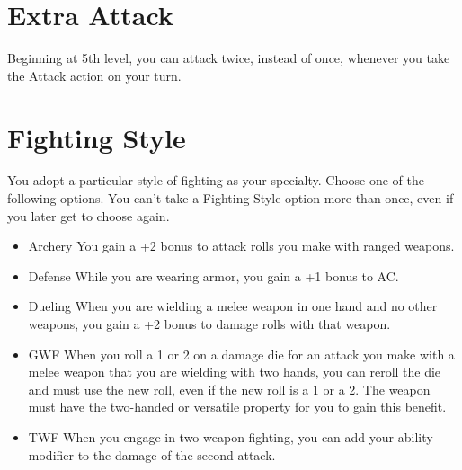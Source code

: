 \begin{multicols*}{2}
   
\section*{Extra Attack} 

Beginning at 5th level, you can attack twice, instead of once, whenever you take the Attack action on your turn.


\section*{Fighting Style}

You adopt a particular style of fighting as your specialty. Choose one of the following options. You can’t take a Fighting Style option more than once, even if you later get to choose again.


\begin{itemize}
    \item Archery You gain a +2 bonus to attack rolls you make with ranged weapons.
    \item Defense While you are wearing armor, you gain a +1 bonus to AC. 
    \item Dueling When you are wielding a melee weapon in one hand and no other weapons, you gain a +2 bonus to damage rolls with that weapon.
    \item GWF When you roll a 1 or 2 on a damage die for an attack you make with a melee weapon that you are wielding with two hands, you can reroll the die and must use the new roll, even if the new roll is a 1 or a 2. The weapon must have the two-handed or versatile property for you to gain this benefit. 
    \item TWF When you engage in two-weapon fighting, you can add your ability modifier to the damage of the second attack.
\end{itemize}



\end{multicols*}
